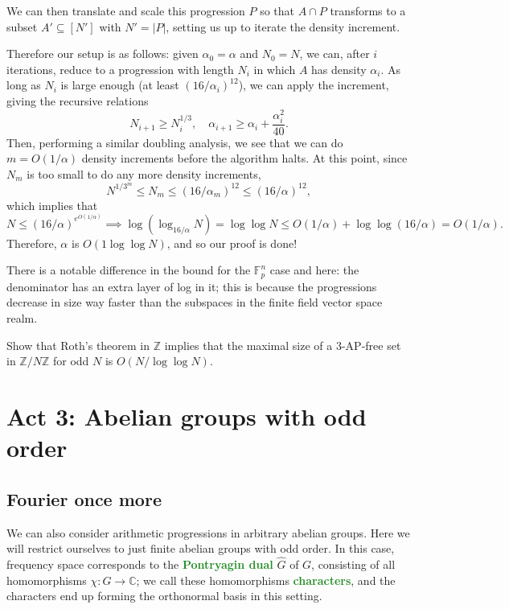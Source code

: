 \documentclass[10pt]{scrartcl}
\providecommand{\CC}{\mathbb C}
\providecommand{\FF}{\mathbb F}
\providecommand{\ZZ}{\mathbb Z}
\renewcommand{\hat}{\widehat}
\providecommand{\vocab}[1]{{\textbf{\textcolor{ForestGreen}{#1}}}}
\begin{document}
We can then translate and scale this progression $P$ so that $A\cap P$
transforms to a subset $A'\subseteq [N']$ with $N' = |P|$,
setting us up to iterate the density increment.

Therefore our setup is as follows:
given $\alpha_0=\alpha$ and $N_0=N$, we can, after $i$ iterations,
reduce to a progression with length $N_i$ in which $A$ has density $\alpha_i$.
As long as $N_i$ is large enough (at least $(16/\alpha_i)^{12}$),
we can apply the increment, giving the recursive relations
\[N_{i+1}\ge N_i^{1/3},\quad \alpha_{i+1}\ge\alpha_i + \frac{\alpha_i^2}{40}.\]
Then, performing a similar doubling analysis, we see that
we can do $m = O(1/\alpha)$ density increments before the algorithm halts.
At this point, since $N_m$ is too small to do any more density increments,
\[N^{1/3^m}\le N_m \le (16/\alpha_m)^{12}\le (16/\alpha)^{12},\]
which implies that
\[N\le (16/\alpha)^{e^{O(1/\alpha)}}\implies \log(\log_{16/\alpha}N) =
\log\log N \le O(1/\alpha) + \log\log(16/\alpha) = O(1/\alpha).\]
Therefore, $\alpha$ is $O(1\log\log N)$,
and so our proof is done!

\begin{remark}
	There is a notable difference in the bound for the $\FF_p^n$ case and here:
	the denominator has an extra layer of log in it;
	this is because the progressions decrease in size
	way faster than the subspaces in the finite field vector space realm.
\end{remark}

\begin{exercise}
	Show that Roth's theorem in $\ZZ$ implies
	that the maximal size of a 3-AP-free set in $\ZZ/N\ZZ$ for odd $N$ is
	$O(N/\log\log N)$.
\end{exercise}

\section{Act 3: Abelian groups with odd order}

\subsection{Fourier once more}
We can also consider arithmetic progressions in arbitrary abelian groups.
Here we will restrict ourselves to just finite abelian groups with odd order.
In this case, frequency space corresponds to the \vocab{Pontryagin dual}
$\hat G$ of $G$, consisting of all homomorphisms $\chi\colon G\to\CC$;
we call these homomorphisms \vocab{characters},
and the characters end up forming the orthonormal basis in this setting.
\end{document}
